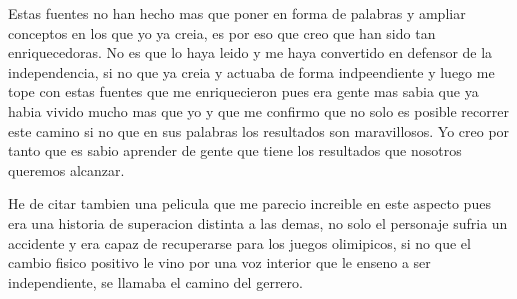 Estas fuentes no han hecho mas que poner en forma de palabras y ampliar conceptos en los que yo ya creia, es por eso que creo que han sido tan enriquecedoras. No es que lo haya leido y me haya convertido en defensor de la independencia, si no que ya creia y actuaba de forma indpeendiente y luego me tope con estas fuentes que me enriquecieron pues era gente mas sabia que ya habia vivido mucho mas que yo y que me confirmo que no solo es posible recorrer este camino si no que en sus palabras los resultados son maravillosos. Yo creo por tanto que es sabio aprender de gente que tiene los resultados que nosotros queremos alcanzar.

He de citar tambien una pelicula que me parecio increible en este aspecto pues era una historia de superacion distinta a las demas, no solo el personaje sufria un accidente y era capaz de recuperarse para los juegos olimipicos, si no que el cambio fisico positivo le vino por una voz interior que le enseno a ser independiente, se llamaba el camino del gerrero.

